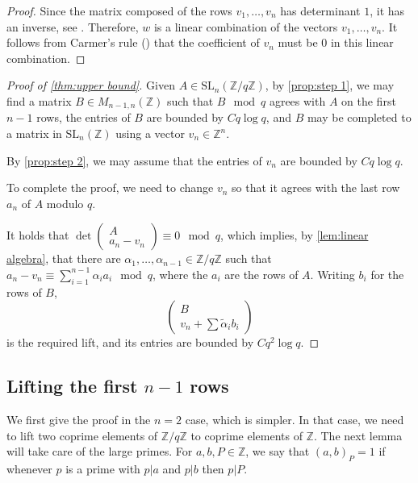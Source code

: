 \documentclass[12pt, a4paper]{amsart}
\numberwithin{equation}{section}
\theoremstyle{definition}
\newcommand{\Z}{\mathbb{Z}}
\newcommand{\SL}{\mathrm{SL}}
\newcommand{\wt}{\widetilde}
\begin{document}
\begin{proof}
Since the matrix composed of the rows $v_1,\ldots,v_n$ has determinant $1$, it has
an inverse, see \cite[Proposition XIII.4.16]{lang}.
Therefore, $w$ is a linear combination of the vectors  $v_1,\ldots,v_n$.
It follows from Carmer's rule (\cite[Theorem XIII.4.4]{lang}) that the coefficient
of $v_n$ must be $0$ in this linear combination.
\end{proof}


\begin{proof}[Proof of \cref{thm:upper bound}]
Given $A\in \SL_n(\Z/q\Z)$, by \cref{prop:step 1}, we may find a matrix $B\in M_{n-1,n}(\Z)$ such that $B \mod q$ agrees with $A$ on the first $n-1$ rows, the entries of $B$ are bounded by $Cq\log q$, and $B$ may be completed to a matrix in $\SL_n(\Z)$ using a vector $v_n \in \Z^n$.  
	
By \cref{prop:step 2}, we may assume that the entries of $v_n$ are bounded by $Cq\log q$.
	
To complete the proof, we need to change $v_{n}$ so that it agrees with the last row $a_n$ of $A$ modulo $q$. 
	
It holds that
$\det\left(\begin{array}{c}
A\\
a_{n}-v_{n}
\end{array}\right)\equiv0\mod q$,
which implies, by \cref{lem:linear algebra}, that there are $\alpha_1,\ldots,\alpha_{n-1}\in \Z/q\Z$ such that $a_{n}-v_{n}\equiv \sum_{i=1}^{n-1}\alpha_{i}a_{i} \mod q$, where the $a_i$ are the rows of $A$.
Writing $b_i$ for the rows of $B$,
\[
\left(\begin{array}{c}
B\\
v_{n}+\sum\wt\alpha_{i}b_{i}
\end{array}\right)
\]
is the required lift, and its entries are bounded by $Cq^2 \log q$.
\end{proof}




\subsection{Lifting the first \texorpdfstring{$n-1$}{n-1} rows}
\label{sec:first step}
We first give the proof in the $n=2$ case, which is simpler.
In that case, we need to lift two coprime elements of $\Z/q\Z$ to coprime elements
of $\Z$.
The next lemma will take care of the large primes.
For $a,b,P \in \Z$, we say that $(a,b)_{P}=1$ if whenever $p$ is a prime with $p|a$ and $p|b$ then $p|P$. 
\end{document}
